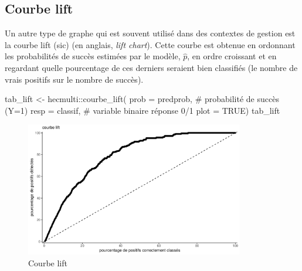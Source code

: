 \documentclass[
  11pt,
  letterpaper,
]{scrbook}
\newenvironment{Shaded}{\begin{snugshade}}{\end{snugshade}}
\newcommand{\AttributeTok}[1]{\textcolor[rgb]{0.40,0.45,0.13}{#1}}
\newcommand{\CommentTok}[1]{\textcolor[rgb]{0.37,0.37,0.37}{#1}}
\newcommand{\ConstantTok}[1]{\textcolor[rgb]{0.56,0.35,0.01}{#1}}
\newcommand{\FunctionTok}[1]{\textcolor[rgb]{0.28,0.35,0.67}{#1}}
\newcommand{\NormalTok}[1]{\textcolor[rgb]{0.00,0.23,0.31}{#1}}
\newcommand{\OtherTok}[1]{\textcolor[rgb]{0.00,0.23,0.31}{#1}}
\newcommand{\SpecialCharTok}[1]{\textcolor[rgb]{0.37,0.37,0.37}{#1}}
\theoremstyle{definition}
\theoremstyle{remark}
\begin{document}
\hypertarget{courbe-lift}{%
\subsection{Courbe lift}\label{courbe-lift}}

Un autre type de graphe qui est souvent utilisé dans des contextes de
gestion est la courbe lift (sic) (en anglais, \emph{lift chart}). Cette
courbe est obtenue en ordonnant les probabilités de succès estimées par
le modèle, \(\widehat{p}\), en ordre croissant et en regardant quelle
pourcentage de ces derniers seraient bien classifiés (le nombre de vrais
positifs sur le nombre de succès).

\begin{Shaded}
\begin{Highlighting}[]
\NormalTok{tab\_lift }\OtherTok{\textless{}{-}}\NormalTok{ hecmulti}\SpecialCharTok{::}\FunctionTok{courbe\_lift}\NormalTok{(}
  \AttributeTok{prob =}\NormalTok{ predprob, }\CommentTok{\# probabilité de succès (Y=1)}
  \AttributeTok{resp =}\NormalTok{ classif, }\CommentTok{\# variable binaire réponse 0/1}
  \AttributeTok{plot =} \ConstantTok{TRUE}\NormalTok{)}
\NormalTok{tab\_lift}
\end{Highlighting}
\end{Shaded}

\begin{figure}[ht!]

{\centering \includegraphics[width=0.85\textwidth,height=\textheight]{./05-reglogistique_files/figure-pdf/fig-lift-1.pdf}

}

\caption{\label{fig-lift}Courbe lift}

\end{figure}
\end{document}
